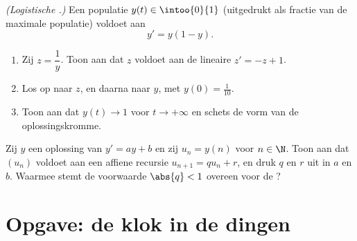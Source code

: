 \begin{exercise}[$\star\star\star$]\label{exo:g12:diffeq:8}
\emph{(Logistische .)} Een populatie $y(t) \in \intoo{0}{1}$
(uitgedrukt als fractie van de maximale populatie) voldoet aan
\[
y' = y(1 - y).
\]
\begin{enumerate}
  \item Zij $z = \dfrac{1}{y}$. Toon aan dat $z$ voldoet aan de lineaire
         $z' = -z + 1$.
  \item Los op naar $z$, en daarna naar $y$, met $y(0) = \frac{1}{10}$.
  \item Toon aan dat $y(t) \to 1$ voor $t \to +\infty$ en schets de vorm van
        de oplossingskromme.
\end{enumerate}
\end{exercise}

\begin{exercise}[$\star\star\star$]\label{exo:g12:diffeq:9}
Zij $y$ een oplossing van $y' = ay + b$ en zij $u_n = y(n)$ voor $n \in \N$.
Toon aan dat $(u_n)$ voldoet aan een affiene recursie
$u_{n+1} = q u_n + r$, en druk $q$ en $r$ uit in $a$ en $b$. Waarmee stemt de
voorwaarde $\abs{q} < 1$ overeen voor de ?
\end{exercise}

\section{Opgave: de klok in de dingen}

